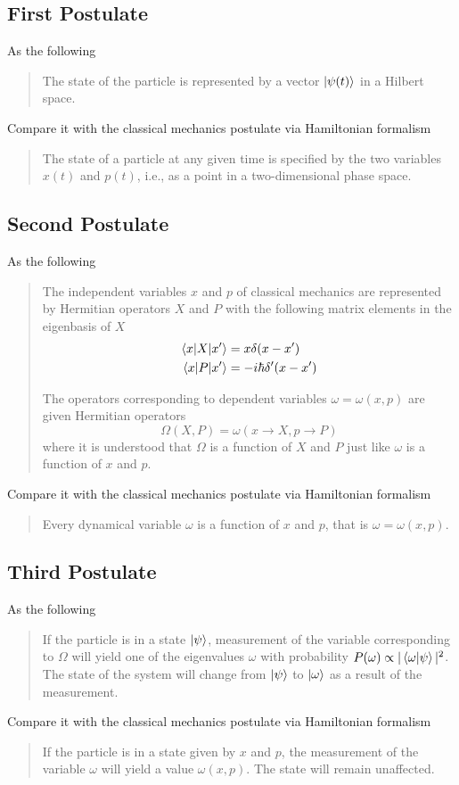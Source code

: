 \documentclass[../../../main.tex]{subfiles}
\begin{document}
\subsection{First Postulate}
As the following
\begin{quotation}
    The state of the particle is represented by a vector $\ket{\psi(t)}$ in a Hilbert space.
\end{quotation}
Compare it with the classical mechanics postulate via Hamiltonian formalism
\begin{quotation}
    The state of a particle at any given time is specified by the two variables $x(t)$ and $p(t)$, i.e., as a point in a two-dimensional phase space.
\end{quotation}

\subsection{Second Postulate}
As the following
\begin{quotation}
    The independent variables $x$ and $p$ of classical mechanics are represented by Hermitian operators $X$ and $P$ with the following matrix elements in the eigenbasis of $X$
    \begin{align*}
        \braket{x|X|x'}&=x\delta(x-x')\\
        \braket{x|P|x'}&=-i\hbar \delta'(x-x')
    \end{align*}

    The operators corresponding to dependent variables $\omega=\omega(x,p)$ are given Hermitian operators
    \begin{equation*}
        \Omega(X,P)=\omega \left( x\rightarrow X, p\rightarrow P \right) 
    \end{equation*}
    where it is understood that $\Omega$ is a function of $X$ and $P$ just like $\omega$ is a function of $x$ and $p$.
\end{quotation}
Compare it with the classical mechanics postulate via Hamiltonian formalism
\begin{quotation}
    Every dynamical variable $\omega$ is a function of $x$ and $p$, that is $\omega=\omega(x,p)$.
\end{quotation}

\subsection{Third Postulate}
As the following
\begin{quotation}
    If the particle is in a state $\ket{\psi}$, measurement of the variable corresponding to $\Omega$ will yield one of the eigenvalues $\omega$ with probability $P(\omega)\propto |\braket{\omega|\psi}|^2$. The state of the system will change from $\ket{\psi}$ to $\ket{\omega}$ as a result of the measurement.
\end{quotation}
Compare it with the classical mechanics postulate via Hamiltonian formalism
\begin{quotation}
    If the particle is in a state given by $x$ and $p$, the measurement of the variable $\omega$ will yield a value $\omega(x,p)$. The state will remain unaffected.
\end{quotation}
\end{document}
